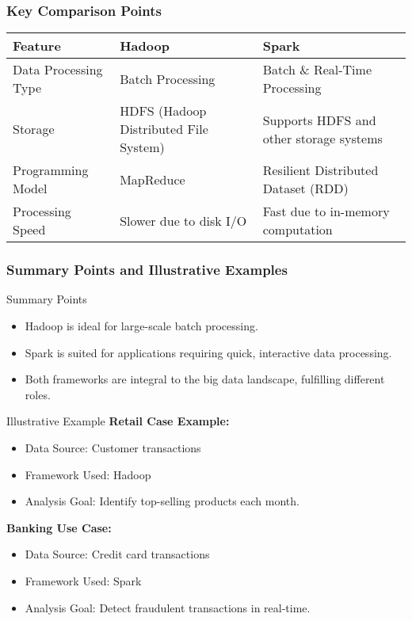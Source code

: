 \documentclass[aspectratio=169]{beamer}
\begin{document}
\begin{frame}[fragile]
    \frametitle{Key Comparison Points}
    \begin{center}
        \begin{tabular}{|l|l|l|}
            \hline
            \textbf{Feature} & \textbf{Hadoop} & \textbf{Spark} \\
            \hline
            Data Processing Type & Batch Processing & Batch \& Real-Time Processing \\
            \hline
            Storage & HDFS (Hadoop Distributed File System) & Supports HDFS and other storage systems \\
            \hline
            Programming Model & MapReduce & Resilient Distributed Dataset (RDD) \\
            \hline
            Processing Speed & Slower due to disk I/O & Fast due to in-memory computation \\
            \hline
        \end{tabular}
    \end{center}
\end{frame}

\begin{frame}[fragile]
    \frametitle{Summary Points and Illustrative Examples}
    \begin{block}{Summary Points}
        \begin{itemize}
            \item Hadoop is ideal for large-scale batch processing.
            \item Spark is suited for applications requiring quick, interactive data processing.
            \item Both frameworks are integral to the big data landscape, fulfilling different roles.
        \end{itemize}
    \end{block}
    \begin{block}{Illustrative Example}
        \textbf{Retail Case Example:}
        \begin{itemize}
            \item Data Source: Customer transactions
            \item Framework Used: Hadoop
            \item Analysis Goal: Identify top-selling products each month.
        \end{itemize}
        
        \textbf{Banking Use Case:}
        \begin{itemize}
            \item Data Source: Credit card transactions
            \item Framework Used: Spark
            \item Analysis Goal: Detect fraudulent transactions in real-time.
        \end{itemize}
    \end{block}
\end{frame}
\end{document}
